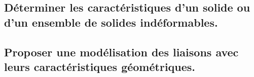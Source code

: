 \documentclass[10pt,fleqn]{book}
\newcommand{\repRel}{../..}
\newcommand{\repStyle}{\repRel/Style}
\newcommand{\td}{fichier_td}
\newcommand{\repExos}{\repRel/ExercicesCompetences}
\newcommand{\repExo}{dossier}
\begin{document}
\subsection{Déterminer les caractéristiques d'un solide ou d'un ensemble de solides indéformables.} 

\renewcommand{\repExo}{\repExos/B2_ProposerModele/B2_10_CartacteristiquesSolides/40_Parallelepipede}
\renewcommand{\td}{40_Parallelepipede}
\graphicspath{{\repStyle/png/}{\repExo/images/}}


\renewcommand{\repExo}{\repExos/B2_ProposerModele/B2_10_CartacteristiquesSolides/41_Parallelepipede}
\renewcommand{\td}{41_Parallelepipede}
\graphicspath{{\repStyle/png/}{\repExo/images/}}


\renewcommand{\repExo}{\repExos/B2_ProposerModele/B2_10_CartacteristiquesSolides/42_Cylindre}
\renewcommand{\td}{42_Cylindre}
\graphicspath{{\repStyle/png/}{\repExo/images/}}


\renewcommand{\repExo}{\repExos/B2_ProposerModele/B2_10_CartacteristiquesSolides/43_Cylindre}
\renewcommand{\td}{43_Cylindre}
\graphicspath{{\repStyle/png/}{\repExo/images/}}


\renewcommand{\repExo}{\repExos/B2_ProposerModele/B2_10_CartacteristiquesSolides/44_Disque}
\renewcommand{\td}{44_Disque}
\graphicspath{{\repStyle/png/}{\repExo/images/}}


\renewcommand{\repExo}{\repExos/B2_ProposerModele/B2_10_CartacteristiquesSolides/45_Disque}
\renewcommand{\td}{45_Disque}
\graphicspath{{\repStyle/png/}{\repExo/images/}}


\renewcommand{\repExo}{\repExos/B2_ProposerModele/B2_10_CartacteristiquesSolides/50_BancBalafre}
\renewcommand{\td}{50_BancBalafre}
\graphicspath{{\repStyle/png/}{\repExo/images/}}


\renewcommand{\repExo}{\repExos/B2_ProposerModele/B2_10_CartacteristiquesSolides/64_EPAS}
\renewcommand{\td}{64_EPAS}
\graphicspath{{\repStyle/png/}{\repExo/images/}}


\renewcommand{\repExo}{\repExos/B2_ProposerModele/B2_10_CartacteristiquesSolides/65_Eclipse}
\renewcommand{\td}{65_Eclipse}
\graphicspath{{\repStyle/png/}{\repExo/images/}}


\subsection{Proposer une modélisation des liaisons avec leurs caractéristiques géométriques.} 
\end{document}
